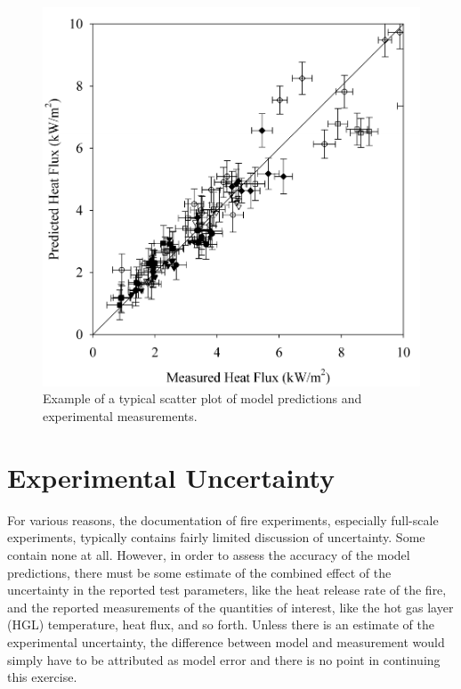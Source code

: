 \begin{figure}[t]
\begin{center}
\includegraphics[height=3.in]{FIGURES/scatterplot}
\end{center}
\caption[Sample scatter plot.]{Example of a typical scatter plot of model predictions and experimental measurements.}
\label{scatterplot}
\end{figure}





\section{Experimental Uncertainty}

For various reasons, the documentation of fire experiments, especially full-scale experiments,
typically contains fairly limited discussion of uncertainty. Some contain none at all.
However, in order to assess the accuracy of the model predictions, there must be some estimate of the
combined effect of the uncertainty in the reported test parameters, like the heat release rate of the fire,
and the reported measurements of the quantities of interest, like the hot gas layer (HGL)
temperature, heat flux, and so forth. Unless there is an estimate of the experimental uncertainty,
the difference between model and measurement
would simply have to be attributed as model error and there is no point in
continuing this exercise.

